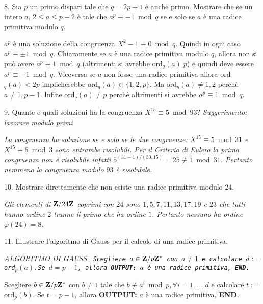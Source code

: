  \item{8.} Sia $p$ un primo dispari tale che $q=2p+1$ \`{e} anche primo. Mostrare che se un intero $a$, $2\leq a\leq p-2$
\`{e} tale che $a^p\equiv-1\bmod q$ se e solo se $a$ \`{e} una radice primitiva modulo $q$.

\bigskip{} $a^p$ \`{e} una soluzione della congruenza $X^2-1\equiv0\bmod q$. Quindi in
ogni caso $a^p\equiv\pm1\bmod q$.
Chiaramente se $a$ \`{e} una radice primitiva modulo $q$, allora non si pu\`{o} avere $a^p\equiv1\bmod q$
(altrimenti si avrebbe ord$_q(a)|p$) e quindi deve essere $a^p\equiv-1\bmod q$. Viceversa se $a$ non fosse
una radice primitiva allora ord$_q(a)<2p$ implicherebbe ord$_q(a)\in\{1,2,p\}$. Ma ord$_q(a)\neq1,2$ perch\`{e}
$a\neq 1,p-1$. Infine ord$_q(a)\neq p$ perch\`{e} altrimenti si avrebbe $a^p\equiv1\bmod q$.\it

\bigskip\bigskip

\item{9.} Quante e quali soluzioni ha la congruenza
$X^{15}\equiv 5 \bmod 93?$
\hfill {\it Suggerimento: lavorare modulo primi}

\bigskip{} \it La congruenza ha soluzione se e solo se le
due congruenze: $X^{15}\equiv 5\bmod31$ e $X^{15}\equiv 5\bmod3$ sono entrambe risolubili.
Per il Criterio di Eulero la prima congruenza non \`{e} risolubile infatti $5^{(31-1)/(30,15)}
=25\not\equiv1\bmod 31$. Pertanto nemmeno la congruenza modulo $93$ \`{e} risolubile.\rm
\bigskip\bigskip

\item{10.} Mostrare direttamente che non esiste una radice primitiva modulo $24$.

\bigskip{} \it Gli elementi di ${\bf Z}/24{\bf Z}$ coprimi con
$24$ sono $1,5,7,11,13,17,19$ e $23$ che tutti
hanno ordine $2$ tranne il primo che ha ordine $1$. Pertanto nessuno ha ordine $\varphi(24)=8$.
\rm\bigskip\bigskip


\item{11.} Illustrare l'algoritmo di Gauss per il calcolo di una radice primitiva.


\bigskip{} \it ALGORITMO DI GAUSS\medskip
\tt {} Scegliere $a\in{\bf Z}/p{\bf Z}^*$ con $a\neq 1$ e calcolare $d:=$ord$_p(a)$.\hfill\break Se
$d=p-1$, allora {\bf OUTPUT:} $a$ \`{e} una radice primitiva, {\bf END}.\medskip

 Scegliere $b\in{\bf Z}/p{\bf Z}^*$ con $b\neq 1$ tale che $b\not\equiv a^i\bmod p, \forall i=1,\ldots,d$
e calcolare $t:=$ord$_p(b)$.\hfill\break
Se $t=p-1$, allora {\bf OUTPUT:} $a$ \`{e} una radice primitiva, {\bf END}.\medskip


